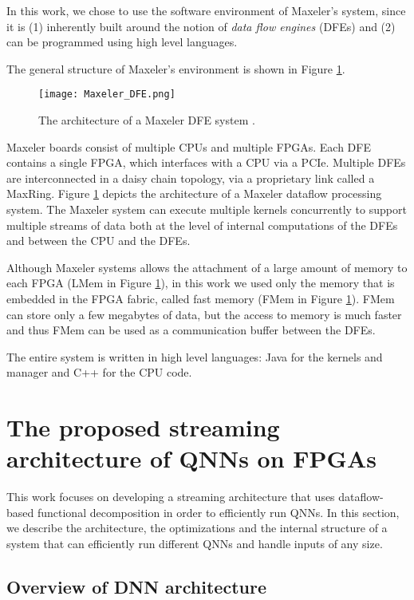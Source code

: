 \documentclass[conference]{IEEEtran}
\begin{document}
	In this work, we chose to use the software environment of Maxeler's system, since it is (1) inherently built around the notion of {\it data flow engines} (DFEs) and (2) can be programmed using high level languages.  
	
	The general structure of Maxeler's environment is shown in Figure \ref{DFE}.
	
	\begin{figure}
		\centering
		\texttt{[image: Maxeler\_DFE.png]}
		\caption{The architecture of a Maxeler DFE system \cite{Oriato2015105}.} 
		\label{DFE}
		\vspace{-1.5em}
	\end{figure}
	
	Maxeler boards consist of multiple CPUs and multiple FPGAs. Each DFE contains a single FPGA, which interfaces with a CPU via a PCIe. Multiple DFEs are interconnected in a daisy chain topology, via a proprietary link called a MaxRing.  Figure \ref{DFE} depicts the architecture of a Maxeler dataflow processing system. 
	The Maxeler system can execute multiple kernels concurrently to support multiple streams of data both at the level of internal computations of the DFEs and between the CPU and the DFEs.
	
	Although Maxeler systems allows the attachment of a large amount of memory to each FPGA (LMem in Figure \ref{DFE}), in this work we used only the memory that is embedded in the FPGA fabric, called fast memory (FMem in Figure \ref{DFE}). FMem can store only a few megabytes of data, but the access to memory is much faster  and thus FMem can be used as a communication buffer between the DFEs.
	
	The entire system is written in high level languages: Java for the kernels and manager and C++ for the CPU code.
	
	
	
	\section{The proposed streaming architecture of QNNs on FPGAs} \label{sec_archtecture}
	
	This work focuses on developing a streaming architecture that uses dataflow-based functional decomposition in order to efficiently run QNNs. In this section, we describe the architecture, the optimizations and the internal structure of a system that can efficiently run different QNNs and handle inputs of any size. 
	
	\subsection {Overview of DNN architecture}
	
\end{document}
